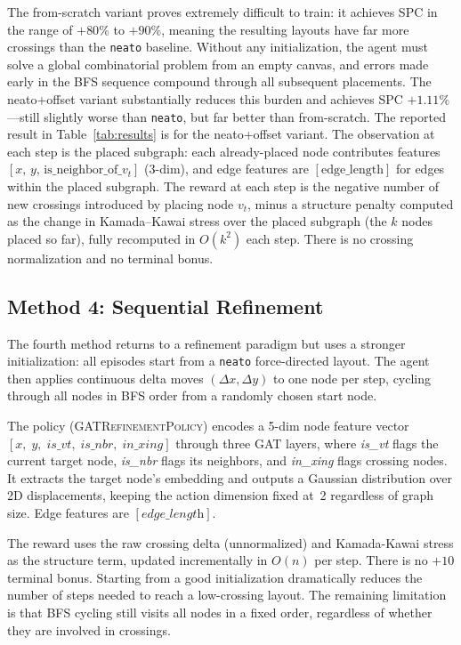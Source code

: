 \documentclass[10pt,twocolumn]{article}
\begin{document}
The from-scratch variant proves extremely difficult to train: it achieves SPC
in the range of $+80\%$ to $+90\%$, meaning the resulting layouts have far
more crossings than the \texttt{neato} baseline.  Without any initialization,
the agent must solve a global combinatorial problem from an empty canvas, and
errors made early in the BFS sequence compound through all subsequent placements.
The neato+offset variant substantially reduces this burden and achieves SPC
$+1.11\%$---still slightly worse than \texttt{neato}, but far better than
from-scratch.  The reported result in Table~\ref{tab:results} is for the neato+offset
variant.  The observation at each step is the placed subgraph: each already-placed
node contributes features $[x,\, y,\, \text{is\_neighbor\_of\_}v_t]$ (3-dim),
and edge features are $[\text{edge\_length}]$ for edges within the placed
subgraph.  The reward at each step is the negative number of new crossings
introduced by placing node $v_t$, minus a structure penalty computed as the
change in Kamada--Kawai stress over the placed subgraph (the $k$ nodes placed
so far), fully recomputed in $O(k^2)$ each step.  There is no crossing
normalization and no terminal bonus.

\subsection{Method 4: Sequential Refinement}

The fourth method returns to a refinement paradigm but uses a stronger
initialization: all episodes start from a \texttt{neato} force-directed
layout.  The agent then applies continuous delta moves $(\Delta x, \Delta y)$
to one node per step, cycling through all nodes in BFS order from a
randomly chosen start node.

The policy (\textsc{GATRefinementPolicy}) encodes a 5-dim node feature
vector $[x,\; y,\; \textit{is\_vt},\; \textit{is\_nbr},\; \textit{in\_xing}]$
through three GAT layers, where \textit{is\_vt} flags the current target
node, \textit{is\_nbr} flags its neighbors, and \textit{in\_xing} flags
crossing nodes.  It extracts the target node's embedding and outputs a
Gaussian distribution over 2D displacements, keeping the action dimension
fixed at~2 regardless of graph size.  Edge features are $[\textit{edge\_length}]$.

The reward uses the raw crossing delta (unnormalized) and Kamada-Kawai
stress as the structure term, updated incrementally in $O(n)$ per step.
There is no $+10$ terminal bonus.  Starting from a good initialization
dramatically reduces the number of steps needed to reach a low-crossing
layout.  The remaining limitation is that BFS cycling still visits all
nodes in a fixed order, regardless of whether they are involved in crossings.
\end{document}
